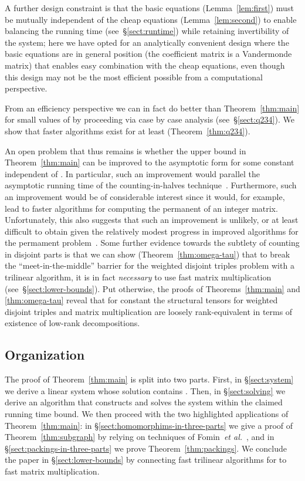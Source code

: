 \documentclass{amsart}
\begin{document}
A further design constraint is that the basic equations (Lemma~\ref{lem:first})
must be mutually independent of the cheap equations (Lemma~\ref{lem:second})
to enable balancing the running time (see~\S\ref{sect:runtime}) 
while retaining invertibility of the system; here we have opted for an 
analytically convenient design where the basic equations are in general 
position (the coefficient matrix is a Vandermonde matrix) that enables easy 
combination with the cheap equations, even though this design may not be 
the most efficient possible from a computational perspective. 

From an efficiency perspective we can in fact do better than 
Theorem~\ref{thm:main} for small values of  by proceeding 
via case by case analysis (see~\S\ref{sect:q234}). 
We show that faster algorithms exist for at least  
(Theorem~\ref{thm:q234}). 

An open problem that thus remains is whether the upper bound 
 in Theorem~\ref{thm:main}
can be improved to the asymptotic form 
 for some constant 
independent of . In particular, such an improvement would
parallel the asymptotic running time  of the
counting-in-halves technique~\cite{BHKK09}. Furthermore, such an
improvement would be of considerable interest since it would, for example, 
lead to faster algorithms for computing the permanent of an 
integer matrix. Unfortunately, this also suggests that such an improvement
is unlikely, or at least difficult to obtain given the relatively 
modest progress in improved algorithms for the permament 
problem~\cite{Bjorklund12}. Some further evidence towards
the subtlety of counting in disjoint parts is that we can show
(Theorem~\ref{thm:omega-tau}) that to break the ``meet-in-the-middle'' 
barrier for the weighted disjoint triples problem with a trilinear 
algorithm, it is in fact {\em necessary} to use fast matrix multiplication 
(see~\S\ref{sect:lower-bounds}). Put otherwise, the proofs of
Theorems~\ref{thm:main} and \ref{thm:omega-tau} reveal that 
for constant  the structural tensors for 
weighted disjoint triples and matrix multiplication are
loosely rank-equivalent in terms of existence of low-rank decompositions.

\subsection{Organization}

The proof of Theorem~\ref{thm:main} is split into two parts.
First, in \S\ref{sect:system} we derive a linear system whose
solution contains . Then, in \S\ref{sect:solving}
we derive an algorithm that constructs and solves the system within the claimed
running time bound. We then proceed with the two highlighted
applications of Theorem~\ref{thm:main}: 
in \S\ref{sect:homomorphims-in-three-parts}
we give a proof of Theorem~\ref{thm:subgraph} by relying on techniques
of Fomin~{\em et al.}~\cite{FLRRS12}, and 
in \S\ref{sect:packings-in-three-parts} we prove Theorem~\ref{thm:packings}.
We conclude the paper in \S\ref{sect:lower-bounds} by connecting
fast trilinear algorithms for  to fast matrix multiplication.
\end{document}

